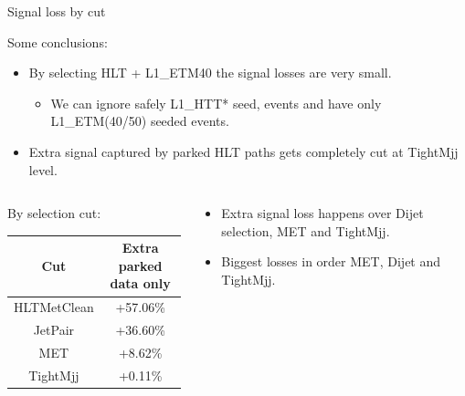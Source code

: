 \documentclass[8pt]{beamer}
\begin{document}
\begin{frame}{Signal loss by cut}

\begin{block}{Some conclusions:}

\begin{itemize}
  \item By selecting HLT + L1\_ETM40 the signal losses are very small.
  \begin{itemize}
    \item We can ignore safely L1\_HTT* seed, events and have only L1\_ETM(40/50) seeded events.
  \end{itemize}  
  \item Extra signal captured by parked HLT paths gets completely cut at TightMjj level.
\end{itemize}


\end{block}

\begin{columns}
 
\column[t]{5.75cm}  

\begin{block}{By selection cut:}
 
\centering 
\begin{tabular}{|c|c|}
\hline
Cut & Extra parked data only \\
\hline
HLTMetClean & +57.06\% \\
JetPair     & +36.60\% \\
MET         &  +8.62\% \\
TightMjj    &  +0.11\% \\
\hline
\end{tabular}

\end{block}

\column[t]{5.75cm}

\begin{block}

\begin{itemize}
  \item Extra signal loss happens over Dijet selection, MET and TightMjj.
  \item Biggest losses in order MET, Dijet and TightMjj.
\end{itemize} 

\end{block}

\end{columns}

\end{frame}
\end{document}
